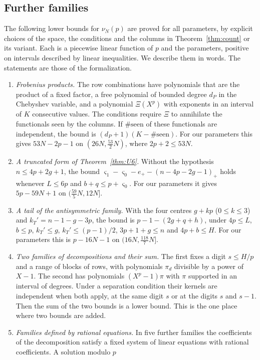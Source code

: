 \documentclass[11pt]{amsart}
\theoremstyle{definition}
\theoremstyle{remark}
\numberwithin{equation}{section}
\begin{document}
\subsection{Further families}\label{ssec:families}
The following lower bounds for $\nu_N(p)$ are proved for all parameters, by explicit choices of the space,
the conditions and the columns in Theorem~\ref{thm:count} or its variant. Each is a piecewise linear function
of $p$ and the parameters, positive on intervals described by linear inequalities. We describe them in
words. The statements are those of the formalization.
\begin{enumerate}[label=(F\arabic*),wide]
\item \emph{Frobenius products.} The row combinations have polynomials that are the product of a fixed
factor, a free polynomial of bounded degree $d_P$ in the Chebyshev variable, and a polynomial $\Xi(X^p)$ with
exponents in an interval of $K$ consecutive values. The conditions require $\Xi$ to annihilate the
functionals seen by the columns. If $\#\text{seen}$ of these functionals are independent, the bound is
$(d_P+1)(K-\#\text{seen})$. For our parameters this gives $53N-2p-1$ on $(26N,\frac{53}2N)$, where $2p+2\le53N$.
\item \emph{A truncated form of Theorem~\ref{thm:U6}.} Without the hypothesis $n\le4p+2g+1$, the bound
$\varsigma_1-\varsigma_0-e_+-(n-4p-2g-1)_+$ holds whenever $L\le6p$ and $b+q\le p+\varsigma_0$. For our parameters it gives
$5p-59N+1$ on $(\frac{59}5N,12N]$.
\item \emph{A tail of the antisymmetric family.} With the four centres $g+kp$ ($0\le k\le3$) and
$k_T'=n-1-g-3p$, the bound is $p-1-(2g+q+h)$, under $4p\le L$, $b\le p$, $k_T'\le g$, $k_T'\le(p-1)/2$,
$3p+1+g\le n$ and $4p+b\le H$. For our parameters this is $p-16N-1$ on $(16N,\frac{118}7N]$.
\item \emph{Two families of decompositions and their sum.} The first fixes a digit $s\le H/p$ and a range of
blocks of rows, with polynomials $\pi_d$ divisible by a power of $X-1$. The second has polynomials
$(X^p-1)\pi$ with $\pi$ supported in an interval of degrees. Under a separation condition their kernels are
independent when both apply, at the same digit $s$ or at the digits $s$ and $s-1$. Then the sum of the two
bounds is a lower bound. This is the one place where two bounds are added.
\item \emph{Families defined by rational equations.} In five further families the coefficients of the
decomposition satisfy a fixed system of linear equations with rational coefficients. A solution modulo $p$

\end{enumerate}
\end{document}
